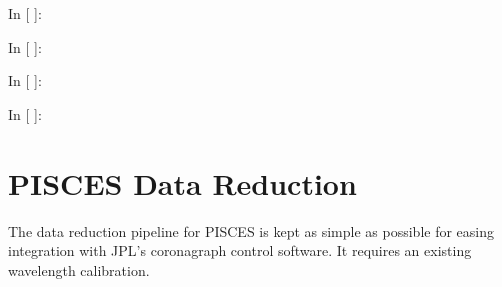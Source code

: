 \documentclass[letterpaper,10pt,english]{sphinxmanual}
\begin{document}
\noindent{}

\noindent{}

\noindent{}

\noindent{}

\noindent{}

\noindent{}

\noindent{}

\noindent{}

\noindent{}

\noindent{}

\noindent{}

\begin{OriginalVerbatim}[commandchars=\\\{\}]
\textcolor{nbsphinxin}{In [ ]: }
\end{OriginalVerbatim}

\begin{OriginalVerbatim}[commandchars=\\\{\}]
\textcolor{nbsphinxin}{In [ ]: }
\end{OriginalVerbatim}

\begin{OriginalVerbatim}[commandchars=\\\{\}]
\textcolor{nbsphinxin}{In [ ]: }
\end{OriginalVerbatim}

\begin{OriginalVerbatim}[commandchars=\\\{\}]
\textcolor{nbsphinxin}{In [ ]: }
\end{OriginalVerbatim}


\chapter{PISCES Data Reduction}
\label{PISCES_Reduce:PISCES-Data-Reduction}\label{PISCES_Reduce::doc}
The data reduction pipeline for PISCES is kept as simple as possible for
easing integration with JPL's coronagraph control software. It requires
an existing wavelength calibration.
\end{document}
